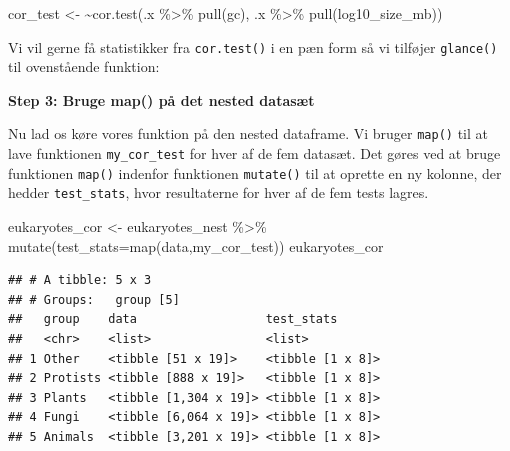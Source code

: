 \documentclass[
]{book}
\newenvironment{Shaded}{\begin{snugshade}}{\end{snugshade}}
\newcommand{\AttributeTok}[1]{\textcolor[rgb]{0.77,0.63,0.00}{#1}}
\newcommand{\ErrorTok}[1]{\textcolor[rgb]{0.64,0.00,0.00}{\textbf{#1}}}
\newcommand{\FunctionTok}[1]{\textcolor[rgb]{0.00,0.00,0.00}{#1}}
\newcommand{\NormalTok}[1]{#1}
\newcommand{\OtherTok}[1]{\textcolor[rgb]{0.56,0.35,0.01}{#1}}
\newcommand{\SpecialCharTok}[1]{\textcolor[rgb]{0.00,0.00,0.00}{#1}}
\begin{document}
\begin{Shaded}
\begin{Highlighting}[]
\NormalTok{cor\_test }\OtherTok{\textless{}{-}} \ErrorTok{\textasciitilde{}}\FunctionTok{cor.test}\NormalTok{(.x }\SpecialCharTok{\%\textgreater{}\%} \FunctionTok{pull}\NormalTok{(gc),}
\NormalTok{                      .x }\SpecialCharTok{\%\textgreater{}\%} \FunctionTok{pull}\NormalTok{(log10\_size\_mb))}
\end{Highlighting}
\end{Shaded}

Vi vil gerne få statistikker fra \texttt{cor.test()} i en pæn form så vi tilføjer \texttt{glance()} til ovenstående funktion:

\begin{Shaded}
\end{Shaded}

\textbf{Step 3: Bruge map() på det nested datasæt}

Nu lad os køre vores funktion på den nested dataframe. Vi bruger \texttt{map()} til at lave funktionen \texttt{my\_cor\_test} for hver af de fem datasæt. Det gøres ved at bruge funktionen \texttt{map()} indenfor funktionen \texttt{mutate()} til at oprette en ny kolonne, der hedder \texttt{test\_stats}, hvor resultaterne for hver af de fem tests lagres.

\begin{Shaded}
\begin{Highlighting}[]
\NormalTok{eukaryotes\_cor }\OtherTok{\textless{}{-}}\NormalTok{ eukaryotes\_nest }\SpecialCharTok{\%\textgreater{}\%} 
  \FunctionTok{mutate}\NormalTok{(}\AttributeTok{test\_stats=}\FunctionTok{map}\NormalTok{(data,my\_cor\_test))}
\NormalTok{eukaryotes\_cor}
\end{Highlighting}
\end{Shaded}

\begin{verbatim}
## # A tibble: 5 x 3
## # Groups:   group [5]
##   group    data                  test_stats      
##   <chr>    <list>                <list>          
## 1 Other    <tibble [51 x 19]>    <tibble [1 x 8]>
## 2 Protists <tibble [888 x 19]>   <tibble [1 x 8]>
## 3 Plants   <tibble [1,304 x 19]> <tibble [1 x 8]>
## 4 Fungi    <tibble [6,064 x 19]> <tibble [1 x 8]>
## 5 Animals  <tibble [3,201 x 19]> <tibble [1 x 8]>
\end{verbatim}
\end{document}
